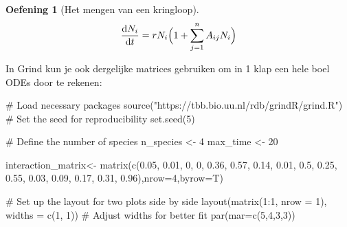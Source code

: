 \documentclass[
  a4paper,
]{scrbook}
\newenvironment{Shaded}{\begin{snugshade}}{\end{snugshade}}
\newcommand{\AttributeTok}[1]{\textcolor[rgb]{0.40,0.45,0.13}{#1}}
\newcommand{\CommentTok}[1]{\textcolor[rgb]{0.37,0.37,0.37}{#1}}
\newcommand{\DecValTok}[1]{\textcolor[rgb]{0.68,0.00,0.00}{#1}}
\newcommand{\FloatTok}[1]{\textcolor[rgb]{0.68,0.00,0.00}{#1}}
\newcommand{\FunctionTok}[1]{\textcolor[rgb]{0.28,0.35,0.67}{#1}}
\newcommand{\NormalTok}[1]{\textcolor[rgb]{0.00,0.23,0.31}{#1}}
\newcommand{\OtherTok}[1]{\textcolor[rgb]{0.00,0.23,0.31}{#1}}
\newcommand{\SpecialCharTok}[1]{\textcolor[rgb]{0.37,0.37,0.37}{#1}}
\newcommand{\StringTok}[1]{\textcolor[rgb]{0.13,0.47,0.30}{#1}}
\theoremstyle{definition}
\newtheorem{exercise}{Oefening}[chapter]
\theoremstyle{remark}
\begin{document}
\begin{exercise}[Het mengen van een
kringloop]
\begin{align}
\mathchoice{\frac{\mathrm{d}N_i}
{\mathrm{d}t}}{\mathrm{d}N_i/\mathrm{d}t}
{\mathrm{d}N_i/\mathrm{d}t}
{\mathrm{d}N_i/\mathrm{d}t} = rN_i \Big( 1 + \sum_{j=1}^n{A_{ij}N_i} \Big)
\end{align}

In Grind kun je ook dergelijke matrices gebruiken om in 1 klap een hele
boel ODEs door te rekenen:

\begin{Shaded}
\begin{Highlighting}[]
\CommentTok{\# Load necessary packages}
\FunctionTok{source}\NormalTok{(}\StringTok{"https://tbb.bio.uu.nl/rdb/grindR/grind.R"}\NormalTok{)}
\CommentTok{\# Set the seed for reproducibility}
\FunctionTok{set.seed}\NormalTok{(}\DecValTok{5}\NormalTok{)}

\CommentTok{\# Define the number of species}
\NormalTok{n\_species }\OtherTok{\textless{}{-}} \DecValTok{4}
\NormalTok{max\_time }\OtherTok{\textless{}{-}} \DecValTok{20}

\NormalTok{interaction\_matrix}\OtherTok{\textless{}{-}} \FunctionTok{matrix}\NormalTok{(}\FunctionTok{c}\NormalTok{(}\FloatTok{0.05}\NormalTok{, }\FloatTok{0.01}\NormalTok{, }\DecValTok{0}\NormalTok{, }\DecValTok{0}\NormalTok{,}
         \FloatTok{0.36}\NormalTok{, }\FloatTok{0.57}\NormalTok{, }\FloatTok{0.14}\NormalTok{, }\FloatTok{0.01}\NormalTok{,}
         \FloatTok{0.5}\NormalTok{, }\FloatTok{0.25}\NormalTok{, }\FloatTok{0.55}\NormalTok{, }\FloatTok{0.03}\NormalTok{,}
         \FloatTok{0.09}\NormalTok{, }\FloatTok{0.17}\NormalTok{, }\FloatTok{0.31}\NormalTok{, }\FloatTok{0.96}\NormalTok{),}\AttributeTok{nrow=}\DecValTok{4}\NormalTok{,}\AttributeTok{byrow=}\NormalTok{T)}

\CommentTok{\# Set up the layout for two plots side by side}
\FunctionTok{layout}\NormalTok{(}\FunctionTok{matrix}\NormalTok{(}\DecValTok{1}\SpecialCharTok{:}\DecValTok{1}\NormalTok{, }\AttributeTok{nrow =} \DecValTok{1}\NormalTok{), }\AttributeTok{widths =} \FunctionTok{c}\NormalTok{(}\DecValTok{1}\NormalTok{, }\DecValTok{1}\NormalTok{))  }\CommentTok{\# Adjust widths for better fit}
\FunctionTok{par}\NormalTok{(}\AttributeTok{mar=}\FunctionTok{c}\NormalTok{(}\DecValTok{5}\NormalTok{,}\DecValTok{4}\NormalTok{,}\DecValTok{3}\NormalTok{,}\DecValTok{3}\NormalTok{))}


\end{Highlighting}
\end{Shaded}
\end{exercise}
\end{document}
